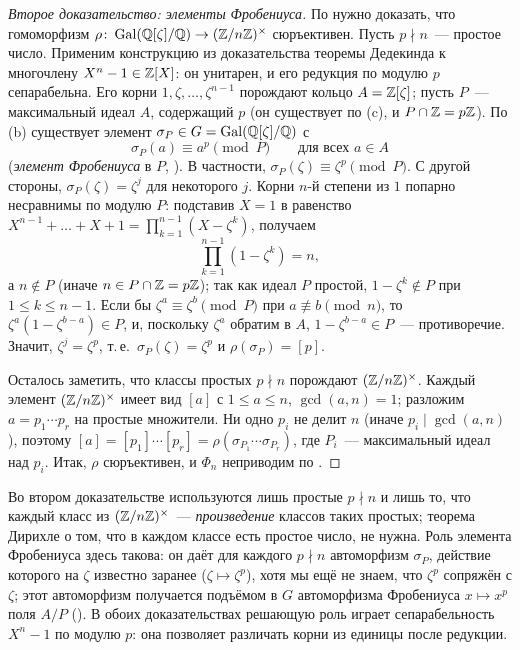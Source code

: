 \begin{proof}[Второе доказательство: элементы Фробениуса]
По  нужно доказать, что гомоморфизм $\rho\colon\operatorname{Gal}(\mathbb Q[\zeta]/\mathbb Q)\to(\mathbb Z/n\mathbb Z)^\times$ сюръективен. Пусть $p\nmid n$~---
простое число. Применим конструкцию из доказательства теоремы Дедекинда  к многочлену $X^n-1\in\mathbb Z[X]$: он унитарен, и
его редукция по модулю $p$ сепарабельна. Его корни $1,\zeta,\dots,\zeta^{n-1}$ порождают кольцо $A=\mathbb Z[\zeta]$; пусть
$P$~--- максимальный идеал $A$, содержащий $p$ (он существует по (c), и $P\cap\mathbb Z=p\mathbb Z$). По (b) существует элемент $\sigma_P\in G=\operatorname{Gal}(\mathbb Q[\zeta]/\mathbb Q)$ с
\[
\sigma_P(a)\equiv a^p\pmod P\qquad\text{для всех } a\in A
\]
(\emph{элемент Фробениуса} в $P$, ). В частности, $\sigma_P(\zeta)\equiv\zeta^p\pmod P$. С другой стороны,
$\sigma_P(\zeta)=\zeta^j$ для некоторого $j$. Корни $n$-й степени из $1$ попарно несравнимы по модулю $P$: подставив $X=1$
в равенство $X^{n-1}+\dots+X+1=\prod_{k=1}^{n-1}(X-\zeta^k)$, получаем
\[
\prod_{k=1}^{n-1}(1-\zeta^k)=n,
\]
а $n\notin P$ (иначе $n\in P\cap\mathbb Z=p\mathbb Z$); так как идеал $P$ простой, $1-\zeta^k\notin P$ при $1\le k\le n-1$. Если бы
$\zeta^a\equiv\zeta^b\pmod P$ при $a\not\equiv b\pmod n$, то $\zeta^a(1-\zeta^{b-a})\in P$, и, поскольку $\zeta^a$
обратим в $A$, $1-\zeta^{b-a}\in P$~--- противоречие. Значит, $\zeta^j=\zeta^p$, т.\,е.\ $\sigma_P(\zeta)=\zeta^p$ и
$\rho(\sigma_P)=[p]$.

Осталось заметить, что классы простых $p\nmid n$ порождают $(\mathbb Z/n\mathbb Z)^\times$. Каждый элемент $(\mathbb Z/n\mathbb Z)^\times$ имеет вид
$[a]$ с $1\le a\le n$, $\gcd(a,n)=1$; разложим $a=p_1\cdots p_r$ на простые множители. Ни одно $p_i$ не делит $n$ (иначе
$p_i\mid\gcd(a,n)$), поэтому $[a]=[p_1]\cdots[p_r]=\rho(\sigma_{P_1}\cdots\sigma_{P_r})$, где $P_i$~--- максимальный идеал над
$p_i$. Итак, $\rho$ сюръективен, и $\Phi_n$ неприводим по .
\end{proof}

Во втором доказательстве используются лишь простые $p\nmid n$ и лишь то, что каждый класс из $(\mathbb Z/n\mathbb Z)^\times$~---
\emph{произведение} классов таких простых; теорема Дирихле о том, что в каждом классе есть простое число, не нужна. Роль
элемента Фробениуса здесь такова: он даёт для каждого $p\nmid n$ автоморфизм $\sigma_P$, действие которого на $\zeta$
известно заранее ($\zeta\mapsto\zeta^p$), хотя мы ещё не знаем, что $\zeta^p$ сопряжён с $\zeta$; этот автоморфизм получается
подъёмом в $G$ автоморфизма Фробениуса $x\mapsto x^p$ поля $A/P$ (). В обоих доказательствах решающую роль играет
сепарабельность $X^n-1$ по модулю $p$: она позволяет различать корни из единицы после редукции.

